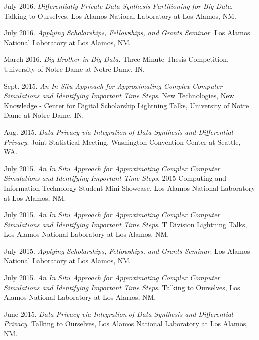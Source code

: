 \documentclass[11pt, letterpaper, roman]{moderncv} %
\begin{document}
\begin{etaremune}[topsep=0pt, itemsep=6pt, partopsep=0pt, parsep=0pt]
  \item July 2016. \textit{Differentially Private Data Synthesis Partitioning for Big Data}. Talking to Ourselves, Los Alamos National Laboratory at Los Alamos, NM.
  
  \item July 2016. \textit{Applying Scholarships, Fellowships, and Grants Seminar}. Los Alamos National Laboratory at Los Alamos, NM.
  
  \item March 2016. \textit{Big Brother in Big Data}. Three Minute Thesis Competition, University of Notre Dame at Notre Dame, IN.

  \item Sept. 2015. \textit{An In Situ Approach for Approximating Complex Computer Simulations and Identifying Important Time Steps}. New Technologies, New Knowledge - Center for Digital Scholarship Lightning Talks, University of Notre Dame at Notre Dame, IN.

  \item Aug. 2015. \textit{Data Privacy via Integration of Data Synthesis and Differential Privacy}. Joint Statistical Meeting, Washington Convention Center at Seattle, WA.

  \item July 2015. \textit{An In Situ Approach for Approximating Complex Computer Simulations and Identifying Important Time Steps}. 2015 Computing and Information Technology Student Mini Showcase, Los Alamos National Laboratory at Los Alamos, NM.

  \item July 2015. \textit{An In Situ Approach for Approximating Complex Computer Simulations and Identifying Important Time Steps}. T Division Lightning Talks, Los Alamos National Laboratory at Los Alamos, NM.
  
  \item July 2015. \textit{Applying Scholarships, Fellowships, and Grants Seminar}. Los Alamos National Laboratory at Los Alamos, NM.
  
  \item July 2015. \textit{An In Situ Approach for Approximating Complex Computer Simulations and Identifying Important Time Steps}. Talking to Ourselves, Los Alamos National Laboratory at Los Alamos, NM.

  \item June 2015. \textit{Data Privacy via Integration of Data Synthesis and Differential Privacy}. Talking to Ourselves, Los Alamos National Laboratory at Los Alamos, NM. 
  

\end{etaremune}
\end{document}
